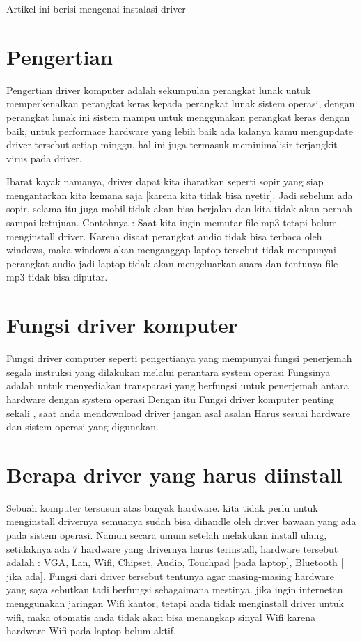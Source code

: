 
Artikel ini berisi mengenai instalasi driver
\section{Pengertian}
Pengertian driver komputer adalah sekumpulan perangkat lunak untuk memperkenalkan perangkat keras kepada perangkat lunak sistem operasi, dengan perangkat lunak ini sistem mampu untuk menggunakan perangkat keras dengan baik, untuk performace hardware yang lebih baik ada kalanya kamu mengupdate driver tersebut setiap minggu, hal ini juga termasuk meminimalisir terjangkit virus pada driver.

Ibarat kayak  namanya, driver dapat kita ibaratkan seperti sopir yang siap mengantarkan kita kemana saja [karena kita tidak bisa nyetir].
Jadi sebelum ada sopir, selama itu juga mobil tidak akan bisa berjalan dan kita tidak akan pernah sampai ketujuan.
Contohnya  : Saat kita ingin memutar file mp3 tetapi belum menginstall driver.
Karena disaat perangkat audio tidak bisa terbaca oleh windows, maka windows akan menganggap laptop tersebut tidak mempunyai perangkat audio jadi laptop tidak akan mengeluarkan suara dan tentunya file mp3 tidak bisa diputar.

\section{Fungsi driver komputer}
Fungsi driver computer seperti pengertianya yang mempunyai fungsi penerjemah segala instruksi yang dilakukan melalui perantara system operasi
Fungsinya adalah untuk menyediakan transparasi yang berfungsi untuk penerjemah antara hardware dengan system operasi 
Dengan itu Fungsi driver komputer penting sekali , saat anda mendownload driver jangan asal asalan
Harus sesuai hardware dan sistem operasi yang digunakan.

\section{Berapa driver yang harus diinstall}

Sebuah komputer tersusun atas banyak hardware.  kita tidak perlu untuk menginstall drivernya  semuanya
sudah bisa dihandle oleh driver bawaan yang ada pada sistem operasi.
Namun secara umum setelah melakukan install ulang, setidaknya ada 7 hardware yang drivernya harus terinstall, hardware tersebut adalah : VGA, Lan, Wifi, Chipset, Audio, Touchpad [pada laptop], Bluetooth [ jika ada].
Fungsi dari driver tersebut tentunya agar masing-masing hardware yang saya sebutkan tadi berfungsi sebagaimana mestinya.
jika ingin internetan menggunakan jaringan Wifi kantor, tetapi anda tidak menginstall driver untuk wifi, maka otomatis anda tidak akan bisa menangkap sinyal Wifi karena hardware Wifi pada laptop belum aktif.

